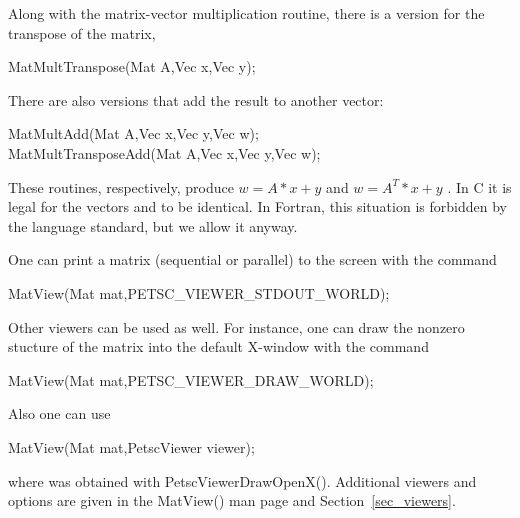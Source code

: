 Along with the matrix-vector multiplication routine, there is 
a version for the transpose of the matrix, 
\begin{tabbing}
  MatMultTranspose(Mat A,Vec x,Vec y);
\end{tabbing}
There are also versions that add the result
to another vector:  
\begin{tabbing}
  MatMultAdd(Mat A,Vec x,Vec y,Vec w);\\
  MatMultTransposeAdd(Mat A,Vec x,Vec y,Vec w);
\end{tabbing}
These routines, respectively, produce $ w = A*x + y $ and $ w = A^{T}*x + y$ . 
In C it is legal for the vectors  and  to be identical.
In Fortran, this situation is forbidden by the language standard, 
but we allow it anyway.

One can print a matrix (sequential or parallel) to the screen with the 
command 
\begin{tabbing}
  MatView(Mat mat,PETSC\_VIEWER\_STDOUT\_WORLD);
\end{tabbing}
Other viewers can be used as well. For instance, one can draw the
nonzero stucture of the matrix into the default X-window with the 
command 
\begin{tabbing}
  MatView(Mat mat,PETSC\_VIEWER\_DRAW\_WORLD);
\end{tabbing}
Also one can use 
\begin{tabbing}
  MatView(Mat mat,PetscViewer viewer);
\end{tabbing}
where  was obtained with PetscViewerDrawOpenX().
Additional viewers  and options are given in the MatView() man
page and Section~\ref{sec_viewers}.

